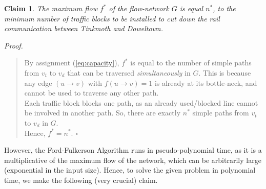 \documentclass[12pt]{report}
\newtheorem{claim}{Claim}
\begin{document}
    \begin{claim}
        \label{claim:max-flow-min-cut}
        The maximum flow $f^{*}$ of the flow-network $G$ is equal $n^{*}$, to the minimum number of traffic blocks to be installed to cut down the
        rail communication between Tinkmoth and Doweltown.
    \end{claim}
    \textit{Proof.}
    \begin{quote}
        By assignment (\ref{eq:capacity}), $f^{*}$ is equal to the number of simple paths from $v_{t}$ to $v_{d}$ that can be traversed \textit{simultaneously} in $G$.
        This is because any edge $(u \to v)$ with $f(u \to v) = 1$ is already at its bottle-neck, and cannot be used to traverse any other path. \\
        Each traffic block blocks one path, as an already used/blocked line cannot be involved in another path. So, there are exactly $n^{*}$ simple
        paths from $v_{t}$ to $v_{d}$ in $G$. \\
        Hence, $f^{*} = n^{*}$. \hfill $\square$
    \end{quote}
    \vfill
    However, the Ford-Fulkerson Algorithm runs in pseudo-polynomial time, as it is a multiplicative of the maximum flow of the network,
    which can be arbitrarily large (exponential in the input size).
    Hence, to solve the given problem in polynomial time, we make the following (very crucial) claim.
    \vspace*{10pt}
\end{document}
